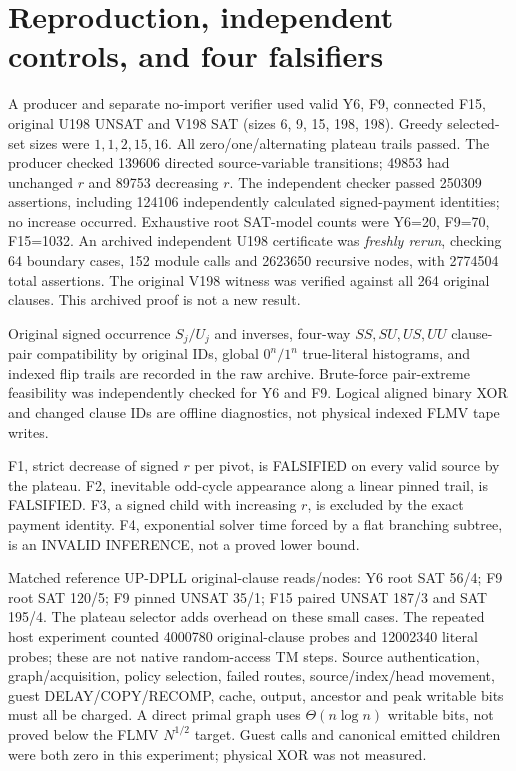 \documentclass[11pt]{article}
\begin{document}
\section{Reproduction, independent controls, and four falsifiers}
A producer and separate no-import verifier used valid Y6, F9, connected F15, original U198 UNSAT and V198 SAT (sizes 6, 9, 15, 198, 198). Greedy selected-set sizes were $1,1,2,15,16$. All zero/one/alternating plateau trails passed. The producer checked 139606 directed source-variable transitions; 49853 had unchanged $r$ and 89753 decreasing $r$. The independent checker passed 250309 assertions, including 124106 independently calculated signed-payment identities; no increase occurred. Exhaustive root SAT-model counts were Y6=20, F9=70, F15=1032. An archived independent U198 certificate was \emph{freshly rerun}, checking 64 boundary cases, 152 module calls and 2623650 recursive nodes, with 2774504 total assertions. The original V198 witness was verified against all 264 original clauses. This archived proof is not a new result.

Original signed occurrence $S_j/U_j$ and inverses, four-way $SS,SU,US,UU$ clause-pair compatibility by original IDs, global $0^n/1^n$ true-literal histograms, and indexed flip trails are recorded in the raw archive. Brute-force pair-extreme feasibility was independently checked for Y6 and F9. Logical aligned binary XOR and changed clause IDs are offline diagnostics, not physical indexed FLMV tape writes.

F1, strict decrease of signed $r$ per pivot, is FALSIFIED on every valid source by the plateau. F2, inevitable odd-cycle appearance along a linear pinned trail, is FALSIFIED. F3, a signed child with increasing $r$, is excluded by the exact payment identity. F4, exponential solver time forced by a flat branching subtree, is an INVALID INFERENCE, not a proved lower bound.

Matched reference UP-DPLL original-clause reads/nodes: Y6 root SAT 56/4; F9 root SAT 120/5; F9 pinned UNSAT 35/1; F15 paired UNSAT 187/3 and SAT 195/4. The plateau selector adds overhead on these small cases. The repeated host experiment counted 4000780 original-clause probes and 12002340 literal probes; these are not native random-access TM steps. Source authentication, graph/acquisition, policy selection, failed routes, source/index/head movement, guest DELAY/COPY/RECOMP, cache, output, ancestor and peak writable bits must all be charged. A direct primal graph uses $\Theta(n\log n)$ writable bits, not proved below the FLMV $N^{1/2}$ target. Guest calls and canonical emitted children were both zero in this experiment; physical XOR was not measured.
\end{document}

